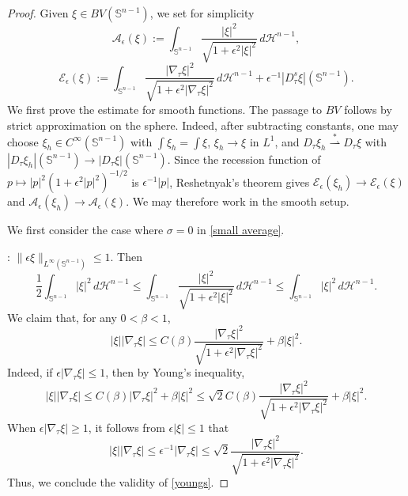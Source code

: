 \documentclass[reqno,11pt]{amsart}
\def\ez{\epsilon}
\def\bz{\beta}
\def\sz{\sigma}
\numberwithin{equation}{section}
\theoremstyle{remark}
\begin{document}
\begin{proof}
Given $\xi\in BV(\mathbb S^{n-1})$,  we set for simplicity
$$
\mathcal A_\epsilon(\xi):=\int_{\mathbb S^{n-1}} \frac{|\xi|^2}{\sqrt{1+\epsilon^2|\xi|^2}}\,d\mathscr H^{n-1},
$$
$$
\mathcal E_\epsilon(\xi):=\int_{\mathbb S^{n-1}} \frac{|\nabla_\tau \xi|^2}{\sqrt{1+\epsilon^2|\nabla_\tau \xi|^2}}\,d\mathscr H^{n-1}
+\ez^{-1}|D^s_\tau \xi|(\mathbb S^{n-1}).
$$
We first prove the estimate for smooth functions. The passage to $BV$ follows by strict approximation on the sphere. Indeed, after subtracting constants, one may choose
$\xi_h\in C^\infty(\mathbb S^{n-1})$ with
$\int\xi_h=\int\xi$, $\xi_h\to\xi$ in $L^1$, and
$D_\tau\xi_h\stackrel{*}{\rightharpoonup}D_\tau\xi$ with
$|D_\tau\xi_h|(\mathbb S^{n-1})\to |D_\tau\xi|(\mathbb S^{n-1})$. Since the
recession function of $p\mapsto |p|^2(1+\epsilon^2|p|^2)^{-1/2}$ is
$\epsilon^{-1}|p|$, Reshetnyak's theorem gives
$\mathcal E_\epsilon(\xi_h) \to \mathcal E_\epsilon(\xi)$ and
$\mathcal A_\epsilon(\xi_h)\to\mathcal A_\epsilon(\xi)$. We may therefore work
in the smooth setup.

We first consider the case where $\sz=0$ in \eqref{small average}.

\medskip
{}: $\|\ez \xi\|_{L^\infty(\mathbb S^{n-1})}\le 1$. Then
\begin{equation}\label{comparable}
 \frac 1 2 \int_{\mathbb S^{n-1}}  {|\xi|^2}  \,d\mathscr H^{n-1}\le \int_{\mathbb S^{n-1}} \frac{|\xi|^2}{\sqrt{1+\ez^2|\xi|^2}} \,d\mathscr H^{n-1}\le \int_{\mathbb S^{n-1}}  {|\xi|^2}  \,d\mathscr H^{n-1}.
\end{equation}
We claim that, for any $0<\bz<1$,
\begin{equation}\label{youngs}
|\xi||\nabla_\tau \xi|\le C(\bz) \frac{|\nabla_\tau  \xi|^2}{\sqrt{1+\ez^2|\nabla_\tau \xi|^2}} + \bz |\xi|^2.
\end{equation}
Indeed, if $\ez|\nabla_\tau \xi|\le 1$, then by Young's inequality,
$$|\xi||\nabla_\tau \xi|\le C(\beta)  |\nabla_\tau \xi|^2 +\bz |\xi|^2\le \sqrt{2} C(\bz) \frac{|\nabla_\tau  \xi|^2}{\sqrt{1+\ez^2|\nabla_\tau \xi|^2}} + \bz |\xi|^2. $$
When $\ez |\nabla_\tau \xi|\ge 1$, it follows from $\ez|\xi|\le 1$ that
$$|\xi||\nabla_\tau \xi|\le \ez^{-1} |\nabla_\tau \xi|\le \sqrt{2}  \frac{|\nabla_\tau  \xi|^2}{\sqrt{1+\ez^2|\nabla_\tau \xi|^2}}. $$
Thus, we conclude the validity of \eqref{youngs}.


\end{proof}
\end{document}
